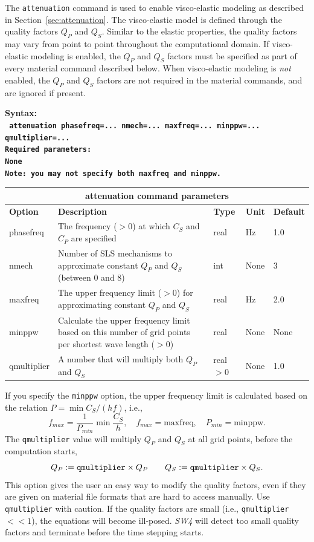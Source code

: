 \documentclass[11pt]{report}
\begin{document}
The \verb+attenuation+ command is used to enable visco-elastic modeling as described in
Section~\ref{sec:attenuation}. The visco-elastic model is defined through the quality factors $Q_P$
and $Q_S$. Similar to the elastic properties, the quality factors may vary from point to point
throughout the computational domain. If visco-elastic modeling is enabled, the $Q_P$ and $Q_S$
factors must be specified as part of every material command described below. When visco-elastic
modeling is {\em not} enabled, the $Q_P$ and $Q_S$ factors are not required in the material
commands, and are ignored if present.
\begin{flushleft}\bf
Syntax:\\
\tt
attenuation phasefreq=... nmech=... maxfreq=... minppw=... qmultiplier=...
\\
\bf Required parameters:\\
\rm None \\
\bf Note: \rm you may not specify both \verb+maxfreq+ and \verb+minppw+.
\end{flushleft}
%
\begin{center}
\begin{tabular}{|l|p{8cm}|l|l|l|} \hline
\multicolumn{5}{|c|}{\bf attenuation command parameters}\\ \hline
\bf{Option} & \bf{Description} & \bf{Type} & \bf{Unit} & \bf{Default} \\ \hline \hline
phasefreq & The frequency ($>0$) at which $C_S$ and $C_P$ are specified & real & Hz & 1.0\\ \hline
nmech     & Number of SLS mechanisms to approximate constant $Q_P$ and $Q_S$ (between 0 and 8) & int & None & 3\\ \hline
maxfreq   & The upper frequency limit  ($>0$) for approximating constant $Q_P$ and $Q_S$ & real & Hz & 2.0 \\ \hline
minppw    & Calculate the upper frequency limit based on this number of grid points per shortest
wave length ($>0$)& real & None & None \\ \hline
qmultiplier & A number that will multiply both $Q_P$ and $Q_S$ & real$>0$  & None & 1.0 \\ \hline
\end{tabular}
\end{center}
If you specify the \verb+minppw+ option, the upper frequency limit is calculated based on the
relation $P=\min C_S/(h f)$, i.e.,
\[
f_{max} = \frac{1}{P_{min}}\min \frac{C_S}{h},\quad f_{max} = \mbox{maxfreq},\quad P_{min}=\mbox{minppw}.
\]
The {\tt qmultiplier} value will multiply $Q_P$ and $Q_S$ at all grid points, before the computation starts,
\[
 Q_P := {\tt qmultiplier} \times Q_P\qquad Q_S := {\tt qmultiplier} \times Q_S.
\] 
This option gives the user an easy way to modify the quality factors, even if they are given on
material file formats that are hard to access manually. Use {\tt qmultiplier} with caution. If the
quality factors are small (i.e., {\tt qmultiplier}$<<1$), the equations will become
ill-posed. \emph{SW4} will detect too small quality factors and terminate before the time stepping
starts.
\end{document}
